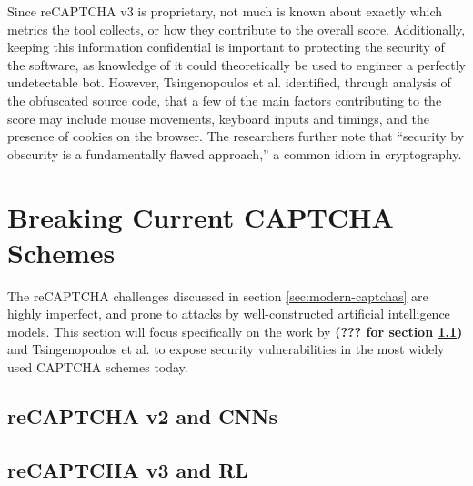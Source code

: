 \documentclass[sigplan,screen,nonacm]{acmart-tagged}
\begin{document}
Since reCAPTCHA v3 is proprietary, not much is known about exactly which metrics the tool collects, or how they contribute to the overall score. Additionally, keeping this information confidential is important to protecting the security of the software, as knowledge of it could theoretically be used to engineer a perfectly undetectable bot. However, Tsingenopoulos et al. \cite{tsingen} identified, through analysis of the obfuscated source code, that a few of the main factors contributing to the score may include mouse movements, keyboard inputs and timings, and the presence of cookies on the browser. The researchers further note that ``security by obscurity is a fundamentally flawed approach,'' a common idiom in cryptography.


\section{Breaking Current CAPTCHA Schemes}
\label{sec:breaking}

The reCAPTCHA challenges discussed in section \ref{sec:modern-captchas} are highly imperfect, and prone to attacks by well-constructed artificial intelligence models. This section will focus specifically on the work by \textbf{(??? for section \ref{sec:v2})} and Tsingenopoulos et al. \cite{tsingen} to expose security vulnerabilities in the most widely used CAPTCHA schemes today.

\subsection{reCAPTCHA v2 and CNNs}
\label{sec:v2}


\subsection{reCAPTCHA v3 and RL}
\label{sec:v3}

\end{document}
